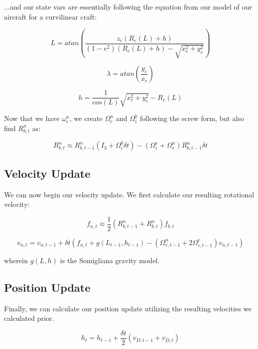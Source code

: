 \documentclass{article}
\begin{document}
...and our state vars are essentially following the equation from our model of our aircraft for a curvilinear craft:

\begin{equation}
    L = atan(\frac{z_e (R_e(L) + h)}{(1-e^2)(R_e(L) + h) - \sqrt{x^2_e + y^2_e}})
\end{equation}

\begin{equation}
    \lambda = atan(\frac{y_e}{x_e})
\end{equation}

\begin{equation}
    h = \frac{1}{cos(L)}\sqrt{x^2_e + y^2_e} - R_e(L)
\end{equation}

Now that we have $\omega^n_e$, we create $\Omega^n_e$ and $\Omega^b_i$ following the screw form, but also find $R^n_{b,t}$ as:

\begin{equation}
    R^n_{b,t} \approx R^n_{b,t-1} (I_3 + \Omega^b_i \delta t) - (\Omega^e_i + \Omega^n_e) R^n_{b,t-1} \delta t
\end{equation}

\subsection*{Velocity Update}

We can now begin our velocity update. We first calculate our resulting rotational velocity:

\begin{equation}
    f_{n,t} \approx \frac{1}{2} (R^n_{b,t-1} + R^n_{b,t}) f_{b,t}
\end{equation}

\begin{equation}
    v_{n,t} = v_{n,t-1} + \delta t (f_{n,t} + g(L_{t-1}, h_{t-1}) - (\Omega^n_{e,t-1} + 2 \Omega^e_{i,t-1})v_{n,t-1})
\end{equation}

wherein $g(L, h)$ is the Somigliana gravity model.

\subsection*{Position Update}

Finally, we can calculate our position update utilizing the resulting velocities we calculated prior.

\begin{equation}
    h_t = h_{t-1} + \frac{\delta t}{2} (v_{D,t-1} + v_{D,t})
\end{equation}
\end{document}
